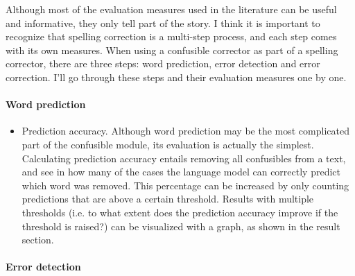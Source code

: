 \documentclass[12pt]{article}
\begin{document}
Although most of the evaluation measures used in the literature can be useful and informative, they only tell part of the story. I think it is important to recognize that spelling correction is a multi-step process, and each step comes with its own measures. When using a confusible corrector as part of a spelling corrector, there are three steps: word prediction, error detection and error correction. I'll go through these steps and their evaluation measures one by one.

\paragraph{Word prediction}

\begin{itemize}
\item Prediction accuracy. Although word prediction may be the most complicated part of the confusible module, its evaluation is actually the simplest. Calculating prediction accuracy entails removing all confusibles from a text, and see in how many of the cases the language model can correctly predict which word was removed. This percentage can be increased by only counting predictions that are above a certain threshold. Results with multiple thresholds (i.e. to what extent does the prediction accuracy improve if the threshold is raised?) can be visualized with a graph, as shown in the result section.
\end{itemize}

\paragraph{Error detection}
\end{document}
